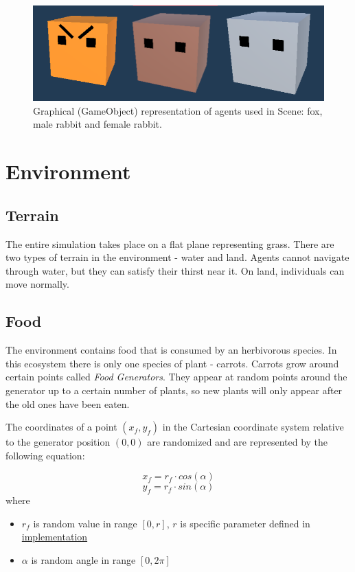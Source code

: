 \begin{figure}
    \centering
    \includegraphics[width=\textwidth]{Images/agents.png}
    \caption{Graphical (GameObject) representation of agents used in Scene: fox, male rabbit and female rabbit.}
    \label{fig:agents}
\end{figure}

\section{Environment}
\subsection{Terrain}
The entire simulation takes place on a flat plane representing grass. There are two types of terrain in the environment - water and land. Agents cannot navigate through water, but they can satisfy their thirst near it. On land, individuals can move normally. 

\subsection{Food}
The environment contains food that is consumed by an herbivorous species. In this ecosystem there is only one species of plant - carrots. Carrots grow around certain points called \emph{Food Generators}. They appear at random points around the generator up to a certain number of plants, so new plants will only appear after the old ones have been eaten. 

The coordinates of a point $(x_f, y_f)$ in the Cartesian coordinate system relative to the generator position $(0, 0)$ are randomized and are represented by the following equation:

\begin{equation}
    x_f = r_f \cdot cos(\alpha)
\end{equation}
\begin{equation}
    y_f = r_f \cdot sin(\alpha)
\end{equation}
where
\begin{itemize}
    \item $r_f$ is random value in range $[0, r]$, $r$ is specific parameter defined in \hyperref[featuresNeedsStatesImplementation]{implementation}
    \item $\alpha$ is random angle in range $[0, 2\pi]$
\end{itemize}

